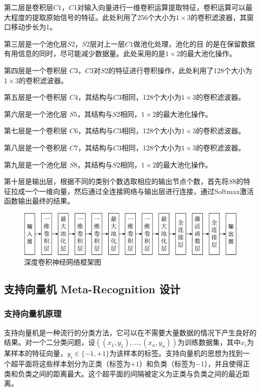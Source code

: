 第二层是卷积层$C1$，$C1$对输入向量进行一维卷积运算提取特征，卷积运算可以最
大程度的提取原始信号的特征。此处利用了256个大小为$1\times 3$的卷积滤波器，其窗口移动步长为1。

第三层是一个池化层$S2$，$S2$层对上一层$C1$做池化处理，池化的目
的是在保留数据有用信息的同时，尽可能减少数据量。此处采用的是$1\times 2$的最大池化操作。

第四层是一个卷积层 $C3$，$C3$对$S2$的特征进行卷积操作，此处利用了128个大小为$1\times 3$的卷积滤波器。

第五层是一个卷积层 $C4$，其结构与$C3$相同，128个大小为$1\times 3$的卷积滤波器。

第六层是一个池化层 $S5$，其结构与$S2$相同，$1\times 2$的最大池化操作。

第七层是一个卷积层 $C6$，其结构与$C3$相同，128个大小为$1\times 3$的卷积滤波器。

第八层是一个卷积层 $C7$，其结构与$C3$相同，128个大小为$1\times 3$的卷积滤波器。

第九层是一个池化层 $S8$，其结构与$S2$相同，$1\times 2$的最大池化操作。

第十层是输出层，根据不同的类别个数选取相应的输出节点个数，首先将$S8$的特征拉成一个一维向量，然后通过全连接网络与输出层进行连接，通过Softmax激活函数输出最终的结果。

\begin{figure}[hbt]
	\centering
	\includegraphics[width=13.5cm]{figures/emitter/struct_emitter}
	\caption{深度卷积神经网络框架图}
	\label{fig:struct_emitter}
\end{figure}

\subsection{支持向量机 Meta-Recognition 设计}

\subsubsection{支持向量机原理}
支持向量机是一种流行的分类方法，它可以在不需要大量数据的情况下产生良好的结果。对一个二分类问题，设$((x_1,y_1),\dots,(x_n,y_n))$为训练数据集，其中$x_i$为某样本的特征向量，$y_i\in\{-1,+1\}$为该样本的标签。支持向量机的思想为找到一个超平面将这些样本划分为正类（标签为$+1$）和负类（标签为$-1$），并且使得正类和负类之间的距离最大。这个超平面的间隔被定义为正类与负类之间的最近距离。

